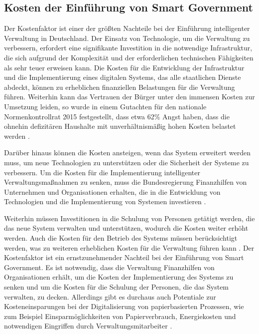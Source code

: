 \subsection{Kosten der Einführung von Smart Government}
Der Kostenfaktor ist einer der größten Nachteile bei der Einführung intelligenter Verwaltung in Deutschland.
Der Einsatz von Technologie, um die Verwaltung zu verbessern, erfordert eine signifikante Investition in die notwendige Infrastruktur, die sich aufgrund der Komplexität und der erforderlichen technischen Fähigkeiten als sehr teuer erweisen kann.
Die Kosten für die Entwicklung der Infrastruktur und die Implementierung eines digitalen Systems, das alle staatlichen Dienste abdeckt, können zu erheblichen finanziellen Belastungen für die Verwaltung führen.
Weiterhin kann das Vertrauen der Bürger unter den immensen Kosten zur Umsetzung leiden, so wurde in einem Gutachten für den nationale Normenkontrollrat 2015 festgestellt, dass etwa 62\% Angst haben, dass die \glqq{}ohnehin defizitären Haushalte mit unverhältnismäßig hohen Kosten belastet\grqq{} werden \citep[][S. 16]{NationalenNormenkontrollrat2015}.
\par
Darüber hinaus können die Kosten ansteigen, wenn das System erweitert werden muss, um neue Technologien zu unterstützen oder die Sicherheit der Systeme zu verbessern.
Um die Kosten für die Implementierung intelligenter Verwaltungsmaßnahmen zu senken, muss die Bundesregierung Finanzhilfen von Unternehmen und Organisationen erhalten, die in die Entwicklung von Technologien und die Implementierung von Systemen investieren \citep[][S. 51]{NationalenNormenkontrollrat2015}.
\par
Weiterhin müssen Investitionen in die Schulung von Personen getätigt werden, die das neue System verwalten und unterstützen, wodurch die Kosten weiter erhöht werden.
Auch die Kosten für den Betrieb des Systems müssen berücksichtigt werden, was zu weiteren erheblichen Kosten für die Verwaltung führen kann \citep[][S. 52, 88]{NationalenNormenkontrollrat2015}.
\clearpage{}
Der Kostenfaktor ist ein ernstzunehmender Nachteil bei der Einführung von Smart Government.
Es ist notwendig, dass die Verwaltung Finanzhilfen von Organisationen erhält, um die Kosten der Implementierung des Systems zu senken und um die Kosten für die Schulung der Personen, die das System verwalten, zu decken.
Allerdings gibt es durchaus auch Potentiale zur Kosteneinsparungen bei der Digitalisierung von papierbasierten Prozessen, wie zum Beispiel Einsparmöglichkeiten von Papierverbrauch, Energiekosten und notwendigen Eingriffen durch Verwaltungsmitarbeiter \citep[Vgl.][S.179]{von_Lucke_2016}.